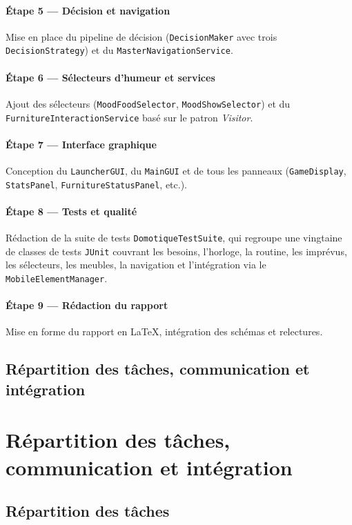 \paragraph{Étape 5 — Décision et navigation} Mise en place du pipeline de décision (\texttt{DecisionMaker} avec trois \texttt{DecisionStrategy}) et du \texttt{MasterNavigationService}.

\paragraph{Étape 6 — Sélecteurs d'humeur et services} Ajout des sélecteurs (\texttt{MoodFoodSelector}, \texttt{MoodShowSelector}) et du \texttt{FurnitureInteractionService} basé sur le patron \textit{Visitor}.

\paragraph{Étape 7 — Interface graphique} Conception du \texttt{LauncherGUI}, du \texttt{MainGUI} et de tous les panneaux (\texttt{GameDisplay}, \texttt{StatsPanel}, \texttt{FurnitureStatusPanel}, etc.).

\paragraph{Étape 8 — Tests et qualité} Rédaction de la suite de tests \texttt{DomotiqueTestSuite}, qui regroupe une vingtaine de classes de tests \texttt{JUnit} couvrant les besoins, l'horloge, la routine, les imprévus, les sélecteurs, les meubles, la navigation et l'intégration via le \texttt{MobileElementManager}.

\paragraph{Étape 9 — Rédaction du rapport} Mise en forme du rapport en \LaTeX, intégration des schémas et relectures.

\subsection{Répartition des tâches, communication et intégration}

\section{Répartition des tâches, communication et intégration}

\subsection{Répartition des tâches}

